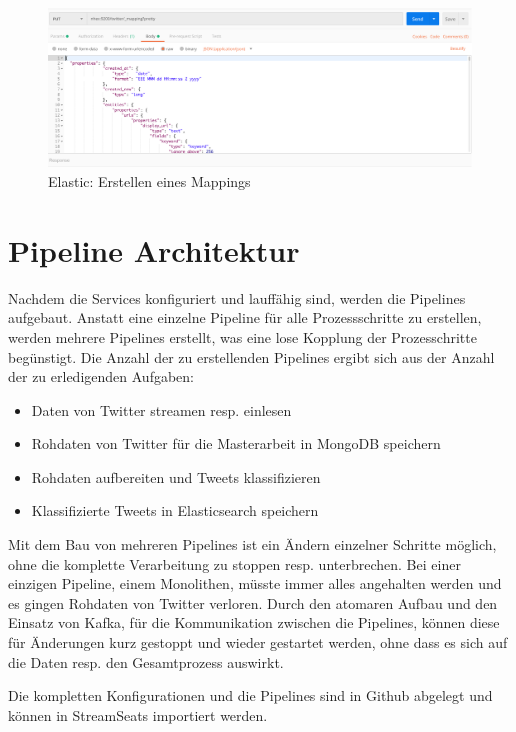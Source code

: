\begin{figure}[H]
	\centering
		\includegraphics[scale=0.2]{images/elastic_create_mapping.png}
	\caption{Elastic: Erstellen eines Mappings}
	\label{fig:elk_mapping}
\end{figure}


\section{Pipeline Architektur}
\label{sec:pipeline_architecture}
Nachdem die Services konfiguriert und lauff{\"a}hig sind, werden die Pipelines aufgebaut. Anstatt eine einzelne Pipeline f{\"u}r alle Prozessschritte zu erstellen, werden mehrere Pipelines erstellt, was eine lose Kopplung der Prozesschritte beg{\"u}nstigt. Die Anzahl der zu erstellenden Pipelines ergibt sich aus der Anzahl der zu erledigenden Aufgaben:

\begin{itemize}
  \item Daten von Twitter streamen resp. einlesen
  \item Rohdaten von Twitter f{\"u}r die Masterarbeit in MongoDB speichern
  \item Rohdaten aufbereiten und Tweets klassifizieren
  \item Klassifizierte Tweets in Elasticsearch speichern
\end{itemize}

Mit dem Bau von mehreren Pipelines ist ein {\"A}ndern einzelner Schritte m{\"o}glich, ohne die komplette Verarbeitung zu stoppen resp. unterbrechen. Bei einer einzigen Pipeline, einem Monolithen, m{\"u}sste immer alles angehalten werden und es gingen Rohdaten von Twitter verloren. Durch den atomaren Aufbau und den Einsatz von Kafka, f{\"u}r die Kommunikation zwischen die Pipelines, k{\"o}nnen diese f{\"u}r {\"A}nderungen kurz gestoppt und wieder gestartet werden, ohne dass es sich auf die Daten resp. den Gesamtprozess auswirkt. 

Die kompletten Konfigurationen und die Pipelines sind in Github abgelegt und k{\"o}nnen in StreamSeats importiert werden.


